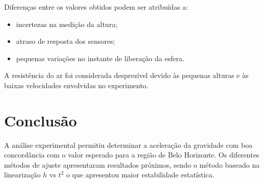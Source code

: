 \documentclass[12pt,a4paper]{article}
\begin{document}
Diferenças entre os valores obtidos podem ser atribuídas a:

\begin{itemize}
\item incertezas na medição da altura;
\item atraso de resposta dos sensores;
\item pequenas variações no instante de liberação da esfera.
\end{itemize}

A resistência do ar foi considerada desprezível devido às pequenas alturas e às baixas velocidades envolvidas no experimento.

\section{Conclusão}

A análise experimental permitiu determinar a aceleração da gravidade com boa concordância com o valor esperado para a região de Belo Horizonte. Os diferentes métodos de ajuste apresentaram resultados próximos, sendo o método baseado na linearização $h$ vs $t^2$ o que apresentou maior estabilidade estatística.



\end{document}

